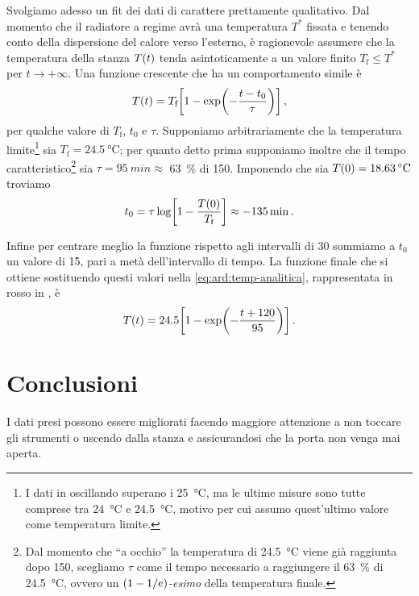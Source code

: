             Svolgiamo adesso un fit dei dati di carattere prettamente qualitativo. Dal momento che il radiatore a regime avrà una temperatura $T^*$ fissata e tenendo conto della dispersione del calore verso l'esterno, è ragionevole assumere che la temperatura della stanza $T\pqty{t}$ tenda asintoticamente a un valore finito $T_\text{f} \leq T^*$ per $t\to+\infty$. Una funzione crescente che ha un comportamento simile è
            \begin{equation}
                T\pqty{t} = T_\text{f}\bqty{1 - \exp\!\pqty{-\frac{t - t_0}{\tau}}}
                \mycomma
                \label{eq:ard:temp-analitica}
            \end{equation}
            per qualche valore di $T_\text{f}$, $t_0$ e $\tau$. Supponiamo arbitrariamente che la temperatura limite\footnote{I dati in  oscillando superano i \SI{25}{\celsius}, ma le ultime misure sono tutte comprese tra \SI{24}{\celsius} e \SI{24.5}{\celsius}, motivo per cui assumo quest'ultimo valore come temperatura limite.} sia $T_\text{f} = \SI{24.5}{\celsius}$; per quanto detto prima supponiamo inoltre che il tempo caratteristico\footnote{Dal momento che ``a occhio'' la temperatura di \SI{24.5}{\celsius} viene già raggiunta dopo \SI{150}{\min}, scegliamo $\tau$ come il tempo necessario a raggiungere il \SI{63}{\%} di \SI{24.5}{\celsius}, ovvero un \textit{$\pqty{1 - 1/e}$-esimo} della temperatura finale.} sia $\tau = \SI{95}{min} \approx$ \SI{63}{\%} di \SI{150}{\min}. Imponendo che sia $T\pqty{0} = \SI{18.63}{\celsius}$ troviamo
            \begin{equation*}
                t_0
                = \tau \log\!\bqty{1-\frac{T\pqty{0}}{T_\text{f}}}
                \approx -\SI{135}{\min}
                \myperiod
            \end{equation*}

            Infine per centrare meglio la funzione rispetto agli intervalli di \SI{30}{\min} sommiamo a $t_0$ un valore di \SI{15}{\min}, pari a metà dell'intervallo di tempo. La funzione finale che si ottiene sostituendo questi valori nella \eqref{eq:ard:temp-analitica}, rappresentata in rosso in , è
            \begin{equation}
                T\pqty{t} =  24.5 \bqty{1 - \exp\!\pqty{-\frac{t + 120}{95}}}
                \myperiod
                \label{eq:ard:temp-numerica}
            \end{equation}

    \section{Conclusioni}
        I dati presi possono essere migliorati facendo maggiore attenzione a non toccare gli strumenti o uscendo dalla stanza e assicurandosi che la porta non venga mai aperta.

